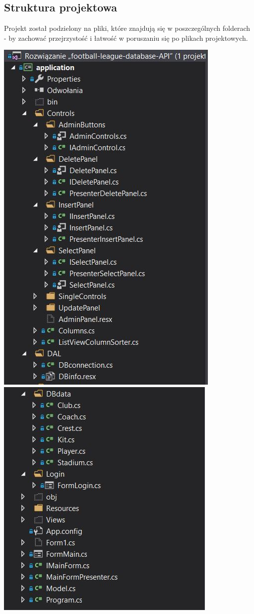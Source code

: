 \documentclass[12pt,a4paper]{article}
\begin{document}
    \subsection{Struktura projektowa}
    Projekt został podzielony na pliki, które znajdują się w poszczególnych folderach - by zachować przejrzystość i łatwość w poruszaniu się po plikach projektowych.
    \begin{center}
        \includegraphics[scale=1]{struct.JPG} \\
        \includegraphics[scale=1]{struct2.JPG}
    \end{center}
    
\end{document}
